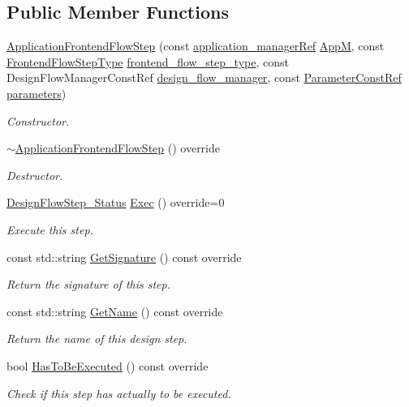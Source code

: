 \subsection*{Public Member Functions}
\begin{DoxyCompactItemize}
\item 
\hyperlink{classApplicationFrontendFlowStep_adb51f03c4fcfca82c538cd88b3d4ff1e}{Application\+Frontend\+Flow\+Step} (const \hyperlink{application__manager_8hpp_a04ccad4e5ee401e8934306672082c180}{application\+\_\+manager\+Ref} \hyperlink{classFrontendFlowStep_a0ac0d8db2a378416583f51c4faa59d15}{AppM}, const \hyperlink{frontend__flow__step_8hpp_afeb3716c693d2b2e4ed3e6d04c3b63bb}{Frontend\+Flow\+Step\+Type} \hyperlink{classFrontendFlowStep_ad49067d6a17119d47316149ab757b60d}{frontend\+\_\+flow\+\_\+step\+\_\+type}, const Design\+Flow\+Manager\+Const\+Ref \hyperlink{classDesignFlowStep_ab770677ddf087613add30024e16a5554}{design\+\_\+flow\+\_\+manager}, const \hyperlink{Parameter_8hpp_a37841774a6fcb479b597fdf8955eb4ea}{Parameter\+Const\+Ref} \hyperlink{classDesignFlowStep_a802eaafe8013df706370679d1a436949}{parameters})
\begin{DoxyCompactList}\small\item\em Constructor. \end{DoxyCompactList}\item 
\hyperlink{classApplicationFrontendFlowStep_a051a5d4690aa304214b13f0ffd1c5bee}{$\sim$\+Application\+Frontend\+Flow\+Step} () override
\begin{DoxyCompactList}\small\item\em Destructor. \end{DoxyCompactList}\item 
\hyperlink{design__flow__step_8hpp_afb1f0d73069c26076b8d31dbc8ebecdf}{Design\+Flow\+Step\+\_\+\+Status} \hyperlink{classApplicationFrontendFlowStep_a2bf060a5ebc1735635dc5c7773387a25}{Exec} () override=0
\begin{DoxyCompactList}\small\item\em Execute this step. \end{DoxyCompactList}\item 
const std\+::string \hyperlink{classApplicationFrontendFlowStep_a25500677dc27a20d35bdb4b45bfdba42}{Get\+Signature} () const override
\begin{DoxyCompactList}\small\item\em Return the signature of this step. \end{DoxyCompactList}\item 
const std\+::string \hyperlink{classApplicationFrontendFlowStep_adc8a9e4cf2fd49e1f0d2270955f474f8}{Get\+Name} () const override
\begin{DoxyCompactList}\small\item\em Return the name of this design step. \end{DoxyCompactList}\item 
bool \hyperlink{classApplicationFrontendFlowStep_ad99f4dcbab470c65eea79ae0291a4bd5}{Has\+To\+Be\+Executed} () const override
\begin{DoxyCompactList}\small\item\em Check if this step has actually to be executed. \end{DoxyCompactList}\end{DoxyCompactItemize}
